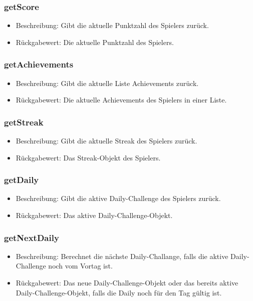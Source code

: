 \documentclass[a4paper]{scrreprt}
\begin{document}
	\subsubsection{getScore}
	\begin{itemize}
		\item Beschreibung: Gibt die aktuelle Punktzahl des Spielers zurück.
		\item Rückgabewert: Die aktuelle Punktzahl des Spielers.
	\end{itemize}
	\subsubsection{getAchievements}
	\begin{itemize}
		\item Beschreibung: Gibt die aktuelle Liste Achievements zurück.
		\item Rückgabewert: Die aktuelle Achievements des Spielers in einer Liste.
	\end{itemize}
	\subsubsection{getStreak}
	\begin{itemize}
		\item Beschreibung: Gibt die aktuelle Streak des Spielers zurück.
		\item Rückgabewert: Das Streak-Objekt des Spielers.
	\end{itemize}
	\subsubsection{getDaily}
	\begin{itemize}
		\item Beschreibung: Gibt die aktive Daily-Challenge des Spielers zurück.
		\item Rückgabewert: Das aktive Daily-Challenge-Objekt.
	\end{itemize}
	\subsubsection{getNextDaily}
	\begin{itemize}
		\item Beschreibung: Berechnet die nächste Daily-Challange, falls die aktive Daily-Challenge noch vom Vortag ist.
		\item Rückgabewert: Das neue Daily-Challenge-Objekt oder das bereits aktive Daily-Challenge-Objekt, falls die Daily noch für den Tag gültig ist.
	\end{itemize}
\end{document}
